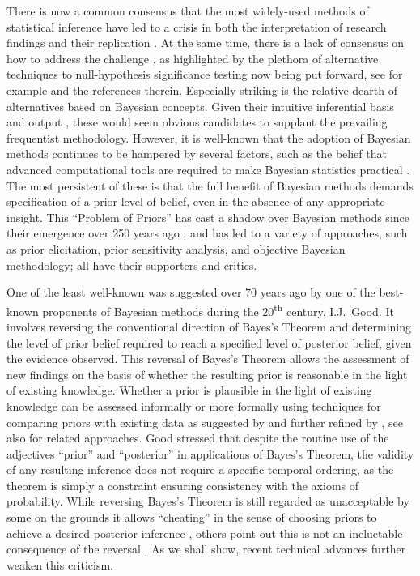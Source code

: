 There is now a common consensus that the most widely-used methods of statistical
inference have led to a crisis in both the interpretation of research findings
and their replication \citep{Gelman2014, Wasserstein2016}. At the same time,
there is a lack of consensus on how to address the challenge
\citep{Matthews2017}, as highlighted by the plethora of alternative techniques
to null-hypothesis significance testing now being put forward, see for example
\citet{Wasserstein2019} and the references therein.
Especially striking is the relative dearth of alternatives based on Bayesian
concepts. Given their intuitive inferential basis and output
\citep{Wagenmakers2008, McElreath2018}, these would seem obvious candidates to
supplant the prevailing frequentist methodology. However, it is well-known that
the adoption of Bayesian methods continues to be hampered by several factors,
such as the belief that advanced computational tools are required to make
Bayesian statistics practical \citep{Green2015}. The most persistent of these is
that the full benefit of Bayesian methods demands specification of a prior level
of belief, even in the absence of any appropriate insight. This ``Problem of
Priors'' has cast a shadow over Bayesian methods since their emergence over 250
years ago \citep{McGrayne2011}, and has led to a variety of approaches, such as
prior elicitation, prior sensitivity analysis, and objective Bayesian
methodology; all have their supporters and critics.

One of the least well-known was suggested over 70 years ago \citep{Good1950} by
one of the best-known proponents of Bayesian methods during the
20\textsuperscript{th} century, I.J.~Good. It involves reversing the
conventional direction of Bayes's Theorem and determining the level of prior
belief required to reach a specified level of posterior belief, given the
evidence observed. This reversal of Bayes's Theorem allows the assessment of new
findings on the basis of whether the resulting prior is reasonable in the light
of existing knowledge. Whether a prior is plausible in the light of existing
knowledge can be assessed informally or more formally using techniques for
comparing priors with existing data as suggested by \citet{Box1980} and further
refined by \citet{Evans2006}, see also \citet{Nott2020, Nott2021} for related
approaches. Good stressed that despite the routine use of the adjectives
``prior'' and ``posterior'' in applications of Bayes's Theorem, the validity of
any resulting inference does not require a specific temporal ordering, as the
theorem is simply a constraint ensuring consistency with the axioms of
probability. While reversing Bayes's Theorem is still regarded as unacceptable
by some on the grounds it allows ``cheating'' in the sense of choosing priors to
achieve a desired posterior inference \citep[p. 143]{OHagan2004}, others point
out this is not an ineluctable consequence of the reversal \citep[pp.
78--79]{Cox2006}. As we shall show, recent technical advances further weaken
this criticism.



